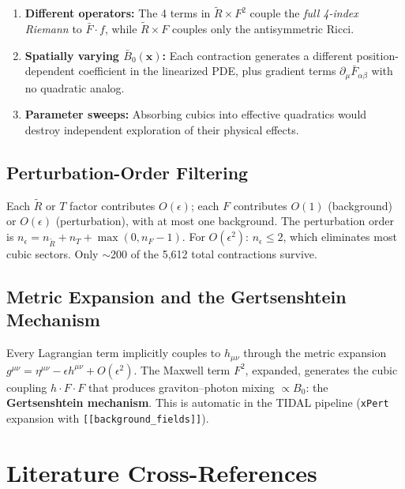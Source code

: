 \documentclass[12pt,a4paper]{article}
\newcommand{\Rt}{\tilde{R}}         %
\newcommand{\pd}{\partial}           %
\begin{document}
\begin{enumerate}
  \item \textbf{Different operators:} The 4 terms in $\Rt \times F^2$
    couple the \emph{full 4-index Riemann} to $\bar{F} \cdot f$,
    while $\Rt \times F$ couples only the antisymmetric Ricci.
  \item \textbf{Spatially varying $\bar{B}_0(\mathbf{x})$:}
    Each contraction generates a different position-dependent
    coefficient in the linearized PDE, plus gradient terms
    $\pd_\mu \bar{F}_{\alpha\beta}$ with no quadratic analog.
  \item \textbf{Parameter sweeps:} Absorbing cubics into
    effective quadratics would destroy independent exploration
    of their physical effects.
\end{enumerate}


\subsection{Perturbation-Order Filtering}

Each $\Rt$ or $T$ factor contributes $O(\epsilon)$; each $F$
contributes $O(1)$ (background) or $O(\epsilon)$ (perturbation),
with at most one background. The perturbation order is
$n_\epsilon = n_{\Rt} + n_T + \max(0, n_F - 1)$.
For $O(\epsilon^2)$: $n_\epsilon \leq 2$, which eliminates most
cubic sectors. Only $\sim$200 of the 5,612 total contractions survive.


\subsection{Metric Expansion and the Gertsenshtein Mechanism}

Every Lagrangian term implicitly couples to $h_{\mu\nu}$ through
the metric expansion $g^{\mu\nu} = \eta^{\mu\nu} - \epsilon h^{\mu\nu}
+ O(\epsilon^2)$. The Maxwell term $F^2$, expanded, generates the
cubic coupling $h \cdot F \cdot F$ that produces graviton--photon
mixing $\propto B_0$: the \textbf{Gertsenshtein mechanism}. This is
automatic in the TIDAL pipeline (\texttt{xPert} expansion with
\texttt{[[background\_fields]]}).


\section{Literature Cross-References}
\label{sec:literature}
\end{document}
